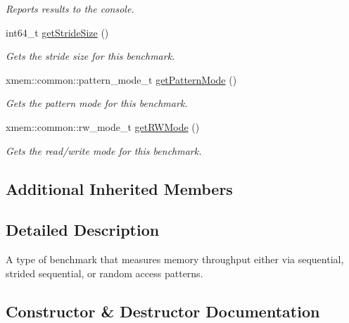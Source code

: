 \begin{DoxyCompactItemize}
\begin{DoxyCompactList}\small\item\em Reports results to the console. \end{DoxyCompactList}\item 
int64\+\_\+t \hyperlink{classxmem_1_1benchmark_1_1_throughput_benchmark_ad31b0fecafb174be0509581cda099d55}{get\+Stride\+Size} ()
\begin{DoxyCompactList}\small\item\em Gets the stride size for this benchmark. \end{DoxyCompactList}\item 
xmem\+::common\+::pattern\+\_\+mode\+\_\+t \hyperlink{classxmem_1_1benchmark_1_1_throughput_benchmark_a2c7dc699b2ae013edd9de871778dff7b}{get\+Pattern\+Mode} ()
\begin{DoxyCompactList}\small\item\em Gets the pattern mode for this benchmark. \end{DoxyCompactList}\item 
xmem\+::common\+::rw\+\_\+mode\+\_\+t \hyperlink{classxmem_1_1benchmark_1_1_throughput_benchmark_acd839b1c7a1d51ff3ce7921a36d65e98}{get\+R\+W\+Mode} ()
\begin{DoxyCompactList}\small\item\em Gets the read/write mode for this benchmark. \end{DoxyCompactList}\end{DoxyCompactItemize}
\subsection*{Additional Inherited Members}


\subsection{Detailed Description}
A type of benchmark that measures memory throughput either via sequential, strided sequential, or random access patterns. 

\subsection{Constructor \& Destructor Documentation}
\hypertarget{classxmem_1_1benchmark_1_1_throughput_benchmark_a7f6fcc030500ebd3aed37d7eacea68dc}{}
